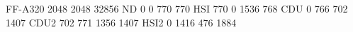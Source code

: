 FF-A320 2048 2048 32856
ND      0    0  770  770
HSI   770    0 1536  768
CDU     0  766  702 1407
CDU2  702  771 1356 1407
HSI2    0 1416  476 1884
